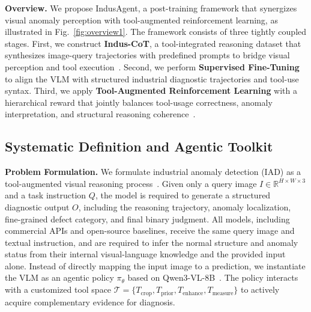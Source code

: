 \documentclass{llmxive}
\begin{document}
\textbf{Overview.}
We propose IndusAgent, a post-training framework that synergizes visual anomaly perception with tool-augmented reinforcement learning, as illustrated in Fig.~\ref{fig:overview1}. The framework consists of three tightly coupled stages. First, we construct \textbf{Indus-CoT}, a tool-integrated reasoning dataset that synthesizes image-query trajectories with predefined prompts to bridge visual perception and tool execution~\citep{wei2022chain, liu2024visual}. Second, we perform \textbf{Supervised Fine-Tuning} to align the VLM with structured industrial diagnostic trajectories and tool-use syntax. Third, we apply \textbf{Tool-Augmented Reinforcement Learning} with a hierarchical reward that jointly balances tool-usage correctness, anomaly interpretation, and structural reasoning coherence~\citep{ouyang2022training}.

\subsection{Systematic Definition and Agentic Toolkit}
\label{sec:Formulation}

\textbf{Problem Formulation.} 
We formulate industrial anomaly detection (IAD) as a tool-augmented visual reasoning process~\citep{gupta2023visual}. 
Given only a query image $I \in \mathbb{R}^{H \times W \times 3}$ and a task instruction $Q$, the model is required to generate a structured diagnostic output $O$, including the reasoning trajectory, anomaly localization, fine-grained defect category, and final binary judgment. 
All models, including commercial APIs and open-source baselines, receive the same query image and textual instruction, and are required to infer the normal structure and anomaly status from their internal visual-language knowledge and the provided input alone.
Instead of directly mapping the input image to a prediction, we instantiate the VLM as an agentic policy $\pi_\theta$ based on Qwen3-VL-8B~\citep{Qwen3-VL}.  
The policy interacts with a customized tool space 
$\mathcal{T}=\{T_{\text{crop}},T_{\text{prior}},T_{\text{enhance}},T_{\text{measure}}\}$ 
to actively acquire complementary evidence for diagnosis.
\end{document}
